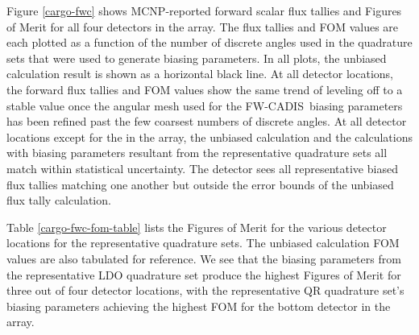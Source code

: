 \documentclass{article} %
\newcommand{\fwc}{\mbox{FW-CADIS}}
\begin{document}
Figure \ref{cargo-fwc} shows MCNP-reported forward scalar flux tallies and
Figures of Merit for all four detectors in the array. The flux tallies and FOM
values are each plotted as a function of the number of discrete angles used in
the quadrature sets that were used to generate biasing parameters. In all
plots, the unbiased calculation result is shown as a horizontal black line. At
all detector locations, the forward flux tallies and FOM values show the same
trend of leveling off to a stable value once the angular mesh used for the
\fwc\ biasing parameters has been refined past the few coarsest numbers of
discrete angles. At all detector locations except for the  in the array,
the unbiased calculation and the calculations with biasing parameters resultant
from the representative quadrature sets all match within statistical
uncertainty. The  detector sees all representative biased flux tallies
matching one another but outside the error bounds of the unbiased flux tally
calculation.

Table \ref{cargo-fwc-fom-table} lists the Figures of Merit for the various
detector locations for the representative quadrature sets. The unbiased
calculation FOM values are also tabulated for reference. We see that the
biasing parameters from the representative LDO quadrature set produce the
highest Figures of Merit for three out of four detector locations, with the
representative QR quadrature set's biasing parameters achieving the highest FOM
for the bottom detector in the array.
\end{document}

